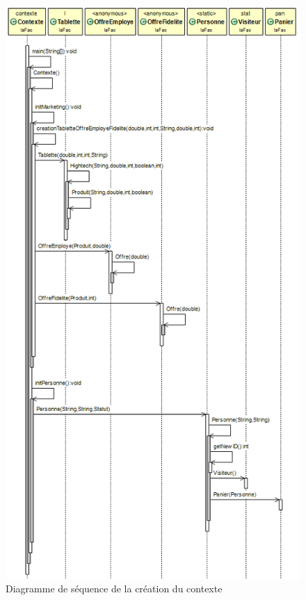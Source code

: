 \documentclass{article}
\begin{document}
\begin{figure}[ht]
	\begin{center}
		\includegraphics[scale=0.38]{creationContexte.png}
		\caption{Diagramme de séquence de la création du contexte}
	\end{center}
\end{figure}
\end{document}
